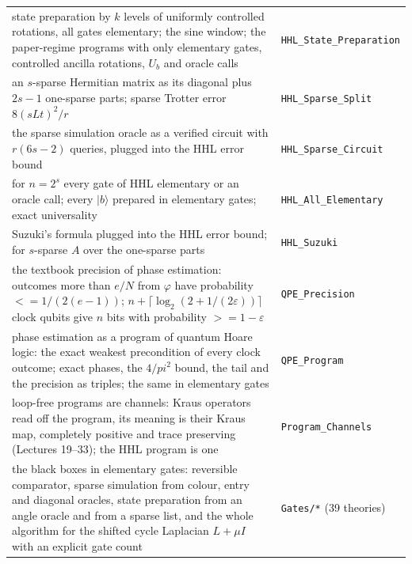 \documentclass[11pt,a4paper]{article}
\newcommand{\ket}[1]{|#1\rangle}
\theoremstyle{definition}
\def\le{<=}\def\ge{>=}\def\to{->}\def\mapsto{|->}\def\oplus{+}\def\kappa{kappa}\def\pi{pi}}
\begin{document}
{\begin{longtable}{p{}l}
state preparation by $k$ levels of uniformly controlled rotations, all gates elementary; the sine window; the paper-regime programs with only elementary gates, controlled ancilla rotations, $U_b$ and oracle calls & \texttt{HHL\_State\_Preparation}\\
an $s$-sparse Hermitian matrix as its diagonal plus $2s-1$ one-sparse parts; sparse Trotter error $8(sLt)^2/r$ & \texttt{HHL\_Sparse\_Split}\\
the sparse simulation oracle as a verified circuit with $r(6s-2)$ queries, plugged into the HHL error bound & \texttt{HHL\_Sparse\_Circuit}\\
for $n=2^s$ every gate of HHL elementary or an oracle call; every $\ket b$ prepared in elementary gates; exact universality & \texttt{HHL\_All\_Elementary}\\
Suzuki's formula plugged into the HHL error bound; for $s$-sparse $A$ over the one-sparse parts & \texttt{HHL\_Suzuki}\\
the textbook precision of phase estimation: outcomes more than $e/N$ from $\varphi$ have probability $\le1/(2(e-1))$; $n+\lceil\log_2(2+1/(2\varepsilon))\rceil$ clock qubits give $n$ bits with probability $\ge1-\varepsilon$ & \texttt{QPE\_Precision}\\
phase estimation as a program of quantum Hoare logic: the exact weakest precondition of every clock outcome; exact phases, the $4/\pi^2$ bound, the tail and the precision as triples; the same in elementary gates & \texttt{QPE\_Program}\\
loop-free programs are channels: Kraus operators read off the program, its meaning is their Kraus map, completely positive and trace preserving (Lectures 19--33); the HHL program is one & \texttt{Program\_Channels}\\
the black boxes in elementary gates: reversible comparator, sparse simulation from colour, entry and diagonal oracles, state preparation from an angle oracle and from a sparse list, and the whole algorithm for the shifted cycle Laplacian $L+\mu I$ with an explicit gate count & \texttt{Gates/*} (39 theories)\\
\end{longtable}}
\end{document}
